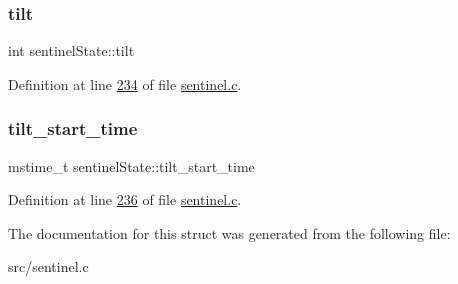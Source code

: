 \subsubsection{\texorpdfstring{tilt}{tilt}}
{\footnotesize\ttfamily int sentinel\+State\+::tilt}



Definition at line \hyperlink{sentinel_8c_source_l00234}{234} of file \hyperlink{sentinel_8c_source}{sentinel.\+c}.

\mbox{\label{structsentinelState_a1d8e73afcd015e9f7a51552886b34787}} 
\subsubsection{\texorpdfstring{tilt\+\_\+start\+\_\+time}{tilt\_start\_time}}
{\footnotesize\ttfamily mstime\+\_\+t sentinel\+State\+::tilt\+\_\+start\+\_\+time}



Definition at line \hyperlink{sentinel_8c_source_l00236}{236} of file \hyperlink{sentinel_8c_source}{sentinel.\+c}.



The documentation for this struct was generated from the following file\+:\begin{DoxyCompactItemize}
\item 
src/sentinel.\+c\end{DoxyCompactItemize}
